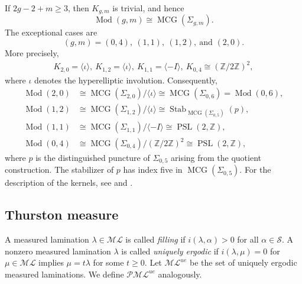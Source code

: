 \documentclass[dvipdfmx]{amsart}
\theoremstyle{remark}
\newcommand{\mcg}{\operatorname{MCG}}
\newcommand{\tmod}{\operatorname{Mod}}
\newcommand{\ml}{\mathcal{ML}}
\newcommand{\pml}{\mathcal{PML}}
\begin{document}
If $2g-2+m\ge3$, then $K_{g,m}$ is trivial, and hence
\[
\tmod(g,m)\cong\mcg(\Sigma_{g,m}).
\]
The exceptional cases are
\[
(g,m)=(0,4),\ (1,1),\ (1,2),\ \text{and }(2,0).
\]
More precisely,
\begin{align*}
K_{2,0}=\langle\iota\rangle,\ 
K_{1,2}=\langle\iota\rangle, \
K_{1,1}=\langle-I\rangle, \
K_{0,4}\cong
(\mathbb Z/2\mathbb Z)^2,
\end{align*}
where $\iota$ denotes the hyperelliptic involution. Consequently,
\begin{align*}
\tmod(2,0)
&\cong
\mcg(\Sigma_{2,0})/\langle\iota\rangle
\cong
\mcg(\Sigma_{0,6})
=
\tmod(0,6),\\
\tmod(1,2)
&\cong
\mcg(\Sigma_{1,2})/\langle\iota\rangle
\cong
\operatorname{Stab}_{\mcg(\Sigma_{0,5})}(p),\\
\tmod(1,1)
&\cong
\mcg(\Sigma_{1,1})/\langle-I\rangle
\cong
\operatorname{PSL}(2,\mathbb Z),\\
\tmod(0,4)
&\cong
\mcg(\Sigma_{0,4})/
(\mathbb Z/2\mathbb Z)^2
\cong
\operatorname{PSL}(2,\mathbb Z),
\end{align*}
where $p$ is the distinguished puncture of $\Sigma_{0,5}$ arising
from the quotient construction. The stabilizer of $p$ has index
five in $\mcg(\Sigma_{0,5})$. For the description of the kernels,
see \cite{BehrstockMargalit2006} and \cite{EarleKra1974}.






\subsection{Thurston measure}
A measured lamination $\lambda\in \ml$ is called \emph{filling} if $i(\lambda,\alpha)>0$ for all $\alpha\in \mathcal{S}$. A nonzero measured lamination $\lambda$ is called \emph{uniquely ergodic} if $i(\lambda,\mu)=0$ for $\mu\in \ml$ implies $\mu=t\lambda$ for some $t\ge 0$.
Let $\ml^{ue}$ be the set of uniquely ergodic measured laminations. We define $\pml^{ue}$ analogously.
\end{document}

